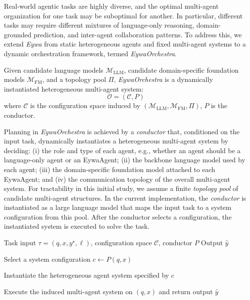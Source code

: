 Real-world agentic tasks are highly diverse, and the optimal multi-agent organization for one task may be suboptimal for another. In particular, different tasks may require different mixtures of language-only reasoning, domain-grounded prediction, and inter-agent collaboration patterns. To address this, we extend \textit{Eywa} from static heterogeneous agents and fixed multi-agent systems to a dynamic orchestration framework, termed \textit{EywaOrchestra}.

\begin{tcolorbox}[
  agentscope,
  float,
  floatplacement=h,
  title=\textbf{EywaOrchestra}
]
\begin{definition}[EywaOrchestra]
\label{def:eywaorchestra}
Given candidate language models $\mathcal{M}_{\mathrm{LLM}}$, candidate domain-specific foundation models $\mathcal{M}_{\mathrm{FM}}$, and a topology pool $\Pi$, \textit{EywaOrchestra} is a dynamically instantiated heterogeneous multi-agent system:
\begin{equation}
\mathcal{O} = (\mathcal{C}, P)
\end{equation}
where $\mathcal{C}$ is the configuration space induced by $(\mathcal{M}_{\mathrm{LLM}}, \mathcal{M}_{\mathrm{FM}}, \Pi)$, $P$ is the conductor.
\end{definition}
\end{tcolorbox}

Planning in \textit{EywaOrchestra} is achieved by a \emph{conductor} that, conditioned on the input task, dynamically instantiates a heterogeneous multi-agent system by deciding: 
(i) the role and type of each agent, e.g., whether an agent should be a language-only agent or an EywaAgent;
(ii) the backbone language model used by each agent;
(iii) the domain-specific foundation model attached to each EywaAgent; and
(iv) the communication topology of the overall multi-agent system.
For tractability in this initial study, we assume a finite \emph{topology pool} of candidate multi-agent structures. In the current implementation, the \emph{conductor} is instantiated as a large language model that maps the input task to a system configuration from this pool. After the conductor selects a configuration, the instantiated system is executed to solve the task.


\begin{algorithm}[t]
\caption{EywaOrchestra: Dynamic Orchestration of Heterogeneous Experts}
\label{alg:eywaorchestra}
\begin{algorithmic}[1]
\REQUIRE Task input $\tau = (q, x, y^\star, \ell)$, configuration space $\mathcal{C}$, conductor $P$
\ENSURE Output $\hat{y}$

\STATE Select a system configuration $c \leftarrow P(q,x)$

\STATE Instantiate the heterogeneous agent system specified by $c$

\STATE Execute the induced multi-agent system on $(q,x)$ and return output $\hat{y}$
\end{algorithmic}
\end{algorithm}

